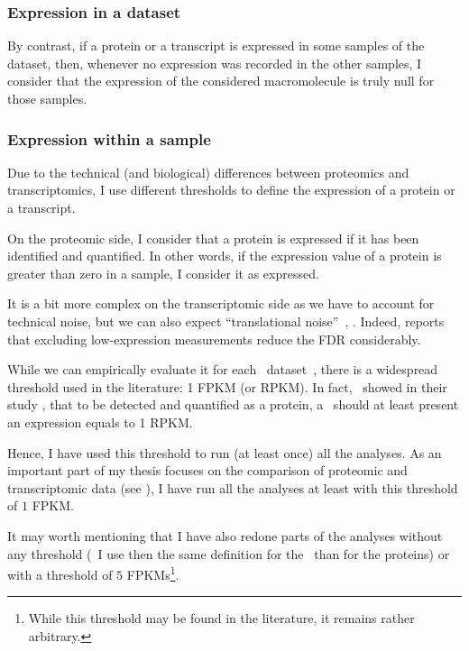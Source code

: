\subsubsection{Expression in a dataset}
\label{subsec:ExpressedOrNot--expDataset}
By contrast, if a protein or a transcript is expressed in some samples of the
dataset, then, whenever no expression was recorded in the other
samples, I consider that the expression of the considered macromolecule is truly
null for those samples.

\subsubsection{Expression within a sample}
Due to the technical (and biological) differences between proteomics and
transcriptomics, I use different thresholds to define the expression of a protein
or a transcript.

On the proteomic side, I consider that a protein is expressed if it has been
identified and quantified. In other words, if the expression value of a protein
is greater than zero in a sample, I consider it as expressed.

\label{subsubsec:exprTrans}
It is a bit more complex on the transcriptomic side as
we have to account for technical noise,
but we can also expect \enquote{translational noise}~,
.
Indeed, \cite{seqcmaqc} reports that
excluding low-expression measurements reduce the \gls{FDR} considerably.

While we can empirically evaluate it for each \Rnaseq\
dataset~,
there is a widespread threshold used in the literature:
1 \gls{FPKM} (or \gls{RPKM}).
In fact,~\citet{Hebenstreit:2011} showed in their study
,
that to be detected and quantified as a protein,
a \mRNA\ should at least present an expression equals to 1 \gls{RPKM}.

Hence, I have used this threshold to run (at least once) all the analyses.
As an important part of my thesis focuses on
the comparison of proteomic and transcriptomic data (see ),
I have run all the analyses at least with this threshold of $1$ \gls{FPKM}.

It may worth mentioning that I have also redone parts of the analyses without
any threshold (\ie\ I use then the same definition for the \mRNAs\ than for the
proteins) or with a threshold of $5$ \glspl{FPKM}\footnote{While this threshold
may be found in the literature, it remains rather arbitrary.}.


